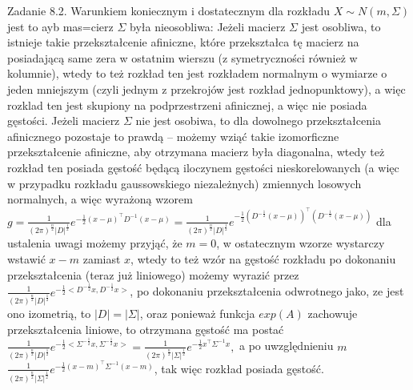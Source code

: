 \documentclass{article}
\begin{document}
Zadanie 8.2.
\newline
\newline
Warunkiem koniecznym i dostatecznym dla rozkładu $X\sim N(m,\Sigma)$ jest to ayb mas=cierz $\Sigma$ była nieosobliwa:\newline
Jeżeli macierz $\Sigma$ jest osobliwa, to istnieje takie przekształcenie afiniczne, które przekształca tę macierz na posiadającą same zera w ostatnim wierszu
(z symetryczności również w kolumnie), wtedy to też rozkład ten jest rozkładem normalnym o wymiarze o jeden mniejszym (czyli jednym z przekrojów jest rozkład jednopunktowy),
a więc rozklad ten jest skupiony na podprzestrzeni afinicznej, a więc nie posiada gęstości.\newline
Jeżeli macierz $\Sigma$ nie jest osobiwa, to dla dowolnego przekształcenia afinicznego pozostaje to prawdą -- możemy wziąć takie izomorficzne przekształcenie afiniczne,
aby otrzymana macierz była diagonalna, wtedy też rozkład ten posiada gęstość będącą iloczynem gęstości nieskorelowanych (a więc w przypadku rozkładu gaussowskiego niezależnych)
zmiennych losowych normalnych, a więc wyrażoną wzorem
$g= \frac{1}{(2\pi)^{\frac{n}{2}}|D|^{\frac{1}{2}}}e^{-\frac{1}{2}(x-\mu)^{\top}D^{-1}(x-\mu)}=
\frac{1}{(2\pi)^{\frac{n}{2}}|D|^{\frac{1}{2}}}e^{-\frac{1}{2}(D^{-\frac{1}{2}}(x-\mu))^{\top}(D^{-\frac{1}{2}}(x-\mu))}$ dla ustalenia uwagi możemy przyjąć, że $m=0$,
w ostatecznym wzorze wystarczy wstawić $x-m$ zamiast $x$, wtedy to też wzór na gęstość rozkładu po dokonaniu przekształcenia (teraz już liniowego)
możemy wyrazić przez $\frac{1}{(2\pi)^{\frac{n}{2}}|D|^{\frac{1}{2}}}e^{-\frac{1}{2}<D^{-\frac{1}{2}}x,D^{-\frac{1}{2}}x>}$, po dokonaniu przekształcenia odwrotnego jako, ze jest ono izometrią,
to $|D|=|\Sigma|$, oraz ponieważ funkcja $exp(A)$ zachowuje przekształcenia liniowe, to otrzymana gęstość ma postać
$\frac{1}{(2\pi)^{\frac{n}{2}}|D|^{\frac{1}{2}}}e^{-\frac{1}{2}<\Sigma^{-\frac{1}{2}}x,\Sigma^{-\frac{1}{2}}x>}=
\frac{1}{(2\pi)^{\frac{n}{2}}|\Sigma|^{\frac{1}{2}}}e^{-\frac{1}{2}x^{\top}\Sigma^{-1}x},$ a po uwzględnieniu $m$\newline
$\frac{1}{(2\pi)^{\frac{n}{2}}|\Sigma|^{\frac{1}{2}}}e^{-\frac{1}{2}(x-m)^{\top}\Sigma^{-1}(x-m)}$, tak więc rozkład posiada gęstość.
\end{document}
